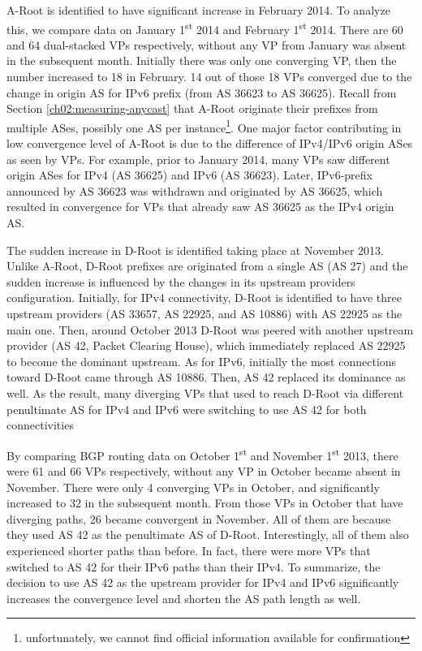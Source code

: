 A-Root is identified to have significant increase in February 2014. To analyze this, we compare data on January 1\textsuperscript{st} 2014 and February 1\textsuperscript{st} 2014. There are 60 and 64 dual-stacked VPs respectively, without any VP from January was absent in the subsequent month. Initially there was only one converging VP, then the number increased to 18 in February. 14 out of those 18 VPs converged due to the change in origin AS for IPv6 prefix (from AS 36623 to AS 36625). Recall from Section \ref{ch02:measuring-anycast} that A-Root originate their prefixes from multiple ASes, possibly one AS per instance\footnote{unfortunately, we cannot find official information available for confirmation}. One major factor contributing in low convergence level of A-Root is due to the difference of IPv4/IPv6 origin ASes as seen by VPs. For example, prior to January 2014, many VPs saw different origin ASes for IPv4 (AS 36625) and IPv6 (AS 36623). Later, IPv6-prefix announced by AS 36623 was withdrawn and originated by AS 36625, which resulted in convergence for VPs that already saw AS 36625 as the IPv4 origin AS. 

The sudden increase in D-Root is identified taking place at November 2013. Unlike A-Root, D-Root prefixes are originated from a single AS (AS 27) and the sudden increase is influenced by the changes in its upstream providers configuration. Initially, for IPv4 connectivity, D-Root is identified to have three upstream providers (AS 33657, AS 22925, and AS 10886) with AS 22925 as the main one. Then, around October 2013 D-Root was peered with another upstream provider (AS 42, Packet Clearing House), which immediately replaced AS 22925 to become the dominant upstream. As for IPv6, initially the most connections toward D-Root came through AS 10886. Then, AS 42 replaced its dominance as well. As the result, many diverging VPs that used to reach D-Root via different penultimate AS for IPv4 and IPv6 were switching to use AS 42 for both connectivities

By comparing BGP routing data on October  1\textsuperscript{st} and November  1\textsuperscript{st} 2013, there were 61 and 66 VPs respectively, without any VP in October became absent in November. There were only 4 converging VPs in October, and  significantly increased to 32 in the subsequent month. From those VPs in October that have diverging paths, 26 became convergent in November. All of them are because they used AS 42 as the penultimate AS of D-Root. Interestingly, all of them also experienced shorter paths than before. In fact, there were more VPs that switched to AS 42 for their IPv6 paths than their IPv4. To summarize, the decision to use AS 42 as the upstream provider for IPv4 and IPv6 significantly increases the convergence level and shorten the AS path length as well.

